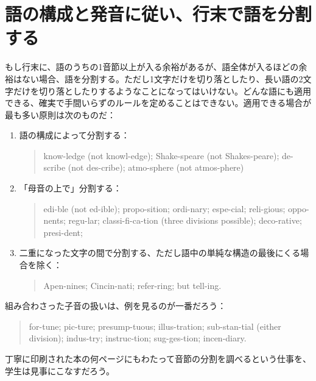 \section{語の構成と発音に従い、行末で語を分割する}
もし行末に、語のうちの1音節以上が入る余裕があるが、語全体が入るほどの余裕はない場合、語を分割する。ただし1文字だけを切り落としたり、長い語の2文字だけを切り落としたりするようなことになってはいけない。どんな語にも適用できる、確実で手間いらずのルールを定めることはできない。適用できる場合が最も多い原則は次のものだ：
\begin{enumerate}
    \item 語の構成によって分割する：
    \begin{quote}
        know-ledge (not knowl-edge); Shake-speare (not Shakes-peare); de-scribe (not des-cribe); atmo-sphere (not atmos-phere)
    \end{quote}
    \item 「母音の上で」分割する：
     \begin{quote}
        edi-ble (not ed-ible); propo-sition; ordi-nary; espe-cial; reli-gious; oppo-nents; regu-lar; classi-fi-ca-tion (three divisions possible); deco-rative; presi-dent;
    \end{quote}
    \item 二重になった文字の間で分割する、ただし語中の単純な構造の最後にくる場合を除く：
     \begin{quote}
        Apen-nines; Cincin-nati; refer-ring; but tell-ing.
    \end{quote}
\end{enumerate}
組み合わさった子音の扱いは、例を見るのが一番だろう：
\begin{quote}
for-tune; pic-ture; presump-tuous; illus-tration; sub-stan-tial (either
division); indus-try; instruc-tion; sug-ges-tion; incen-diary.    
\end{quote}
丁寧に印刷された本の何ページにもわたって音節の分割を調べるという仕事を、学生は見事にこなすだろう。
